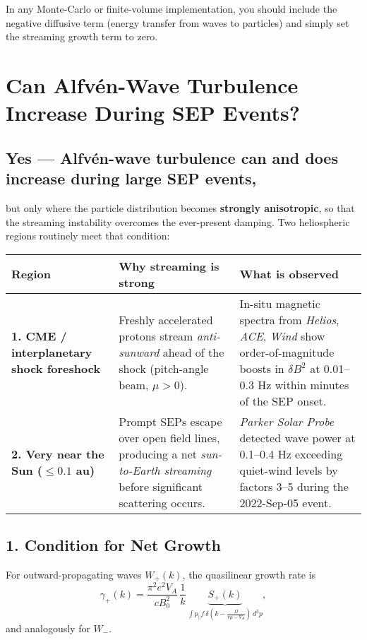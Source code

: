 \medskip

\noindent
In any Monte-Carlo or finite-volume implementation, you should include the negative diffusive term (energy transfer from waves to particles) and simply set the streaming growth term to zero.


\section*{Can Alfvén-Wave Turbulence Increase During SEP Events?}

\subsection*{Yes — Alfvén-wave turbulence \textbf{can and does increase} during large SEP events,}
but only where the particle distribution becomes \textbf{strongly anisotropic}, so that the streaming instability overcomes the ever-present damping. Two heliospheric regions routinely meet that condition:

\begin{center}
\renewcommand{\arraystretch}{1.5}
\begin{tabular}{@{}p{4.5cm} p{5.8cm} p{5.8cm}@{}}
\toprule
\textbf{Region} & \textbf{Why streaming is strong} & \textbf{What is observed} \\
\midrule
\textbf{1. CME / interplanetary shock foreshock} &
Freshly accelerated protons stream \textit{anti-sunward} ahead of the shock (pitch-angle beam, $\mu > 0$). &
In-situ magnetic spectra from \textit{Helios}, \textit{ACE}, \textit{Wind} show order-of-magnitude boosts in $\delta B^2$ at 0.01–0.3 Hz within minutes of the SEP onset. \\
\textbf{2. Very near the Sun ($\leq 0.1$ au)} &
Prompt SEPs escape over open field lines, producing a net \textit{sun-to-Earth streaming} before significant scattering occurs. &
\textit{Parker Solar Probe} detected wave power at 0.1–0.4 Hz exceeding quiet-wind levels by factors 3–5 during the 2022-Sep-05 event. \\
\bottomrule
\end{tabular}
\end{center}

\subsection*{1. Condition for Net Growth}

For outward-propagating waves $W_{+}(k)$, the quasilinear growth rate is
\[
\gamma_{+}(k)=
\frac{\pi^{2}e^{2}V_{A}}{cB_{0}^{2}}\,
\frac{1}{k}\,
\underbrace{S_{+}(k)}_{\displaystyle
\int\!p_\parallel f\,\delta\!\left(k-\frac{\Omega}{v\mu-V_{A}}\right)\,d^{3}p},
\]
and analogously for $W_{-}$.

